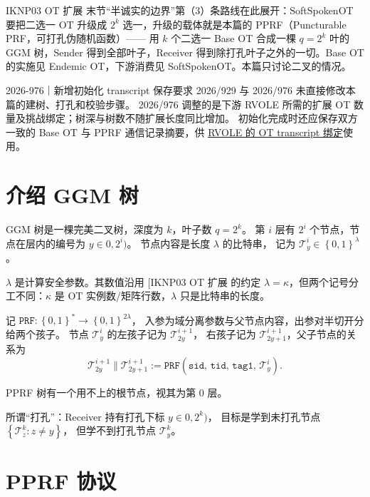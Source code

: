 

IKNP03 OT 扩展 末节“半诚实的边界”第（3）条路线在此展开：SoftSpokenOT
要把二选一 OT 升级成 $2^k$ 选一，升级的载体就是本篇的 PPRF（Puncturable
PRF，可打孔伪随机函数）------ 用 $k$ 个二选一 Base OT
合成一棵 $q = 2^k$ 叶的 GGM 树，Sender 得到全部叶子，Receiver
得到除打孔叶子之外的一切。Base OT 的实施见 Endemic OT，下游消费见
SoftSpokenOT。本篇只讨论二叉的情况。

\begin{patchnote}{2026-976｜新增初始化 transcript 保存要求}
2026/929 与 2026/976 未直接修改本篇的建树、打孔和校验步骤。
2026/976 调整的是下游 RVOLE 所需的扩展 OT 数量及挑战绑定；树深与树数不随扩展长度同比增加。
初始化完成时还应保存双方一致的 Base OT 与 PPRF 通信记录摘要，供
\hyperref[sec:rvole:parameters-model]{RVOLE 的 OT transcript 绑定}使用。
\end{patchnote}

\section{介绍 GGM 树}

GGM 树是一棵完美二叉树，深度为 $k$，叶子数 $q=2^k$。
第 $i$ 层有 $2^i$ 个节点，节点在层内的编号为 $y\in 0, 2^i)$。
节点内容是长度 $\lambda$ 的比特串，
记为 $\mathcal{T}^i_y \in \left\{0, 1\right\}^\lambda$。

$\lambda$ 是计算安全参数。其数值沿用 {[}IKNP03 OT 扩展
的约定 $\lambda = \kappa$，但两个记号分工不同：$\kappa$ 是 OT
实例数/矩阵行数，$\lambda$ 只是比特串的长度。

记 $\mathtt{PRF}: \left\{0,1\right\}^* \rightarrow \left\{0,1\right\}^{2\lambda}$，
入参为域分离参数与父节点内容，出参对半切开分给两个孩子。
节点 $\mathcal{T}^i_y$ 的左孩子记为 $\mathcal{T}^{i+1}_{2y}$，
右孩子记为 $\mathcal{T}^{i+1}_{2y+1}$，父子节点的关系为
\begin{equation}\label{eq:04-pprf:step}
\mathcal{T}^{i+1}_{2y} \mathbin{\|} \mathcal{T}^{i+1}_{2y+1} := \mathtt{PRF}(\mathtt{sid},\, \mathtt{tid},\, \mathtt{tag1},\, \mathcal{T}^i_y). \tag{step}
\end{equation}

PPRF 树有一个用不上的根节点，视其为第 0 层。

所谓“打孔”：Receiver 持有打孔下标 $y\in0, 2^k)$，
目标是学到未打孔节点 $\left\{\mathcal{T}^k_z: z\neq y\right\}$，
但学不到打孔节点 $\mathcal{T}^k_y$。

\section{PPRF 协议}
